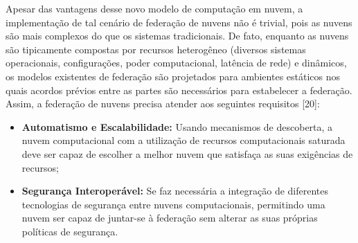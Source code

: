 Apesar das vantagens desse novo modelo de computação em nuvem, a implementação de tal cenário de federação de nuvens não é trivial, pois as nuvens são mais complexos do que os sistemas tradicionais. De fato, enquanto as nuvens são tipicamente compostas por recursos heterogêneo (diversos sistemas operacionais, configurações, poder computacional, latência de rede) e dinâmicos, os modelos existentes de federação são projetados para ambientes estáticos nos quais acordos prévios entre as partes são necessários para estabelecer a federação. Assim, a federação de nuvens precisa atender aos seguintes requisitos [20]:

\begin{itemize}
	\item \textbf{Automatismo e Escalabilidade:} Usando mecanismos de descoberta, a nuvem computacional com a utilização de recursos computacionais saturada deve ser capaz de escolher a melhor nuvem que satisfaça as suas exigências de recursos;
    \item \textbf{Segurança Interoperável:} Se faz necessária a integração de diferentes tecnologias de segurança entre nuvens computacionais, permitindo uma nuvem ser capaz de juntar-se à federação sem alterar as suas próprias políticas de segurança.
\end{itemize}


